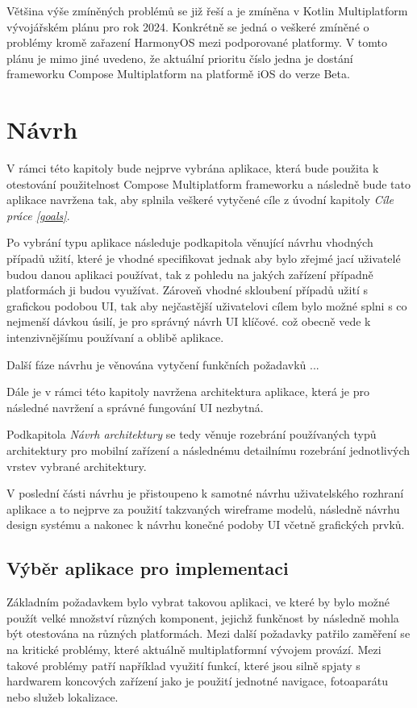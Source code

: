 Většina výše zmíněných problémů se již řeší a je zmíněna v Kotlin Multiplatform vývojářském plánu pro rok 2024. \cite{KMPRoaddMap} Konkrétně
se jedná o veškeré zmíněné o problémy kromě zařazení HarmonyOS mezi podporované platformy.%
V tomto plánu je mimo jiné uvedeno, že aktuální prioritu číslo jedna je dostání frameworku Compose Multiplatform na platformě iOS do verze Beta. \cite{KMPRoaddMap}

\chapter{Návrh}
V rámci této kapitoly bude nejprve vybrána aplikace, která bude použita k otestování použitelnost Compose Multiplatform frameworku a následně
bude tato aplikace navržena tak, aby splnila veškeré vytyčené cíle z úvodní kapitoly \textit{Cíle práce \ref{goals}}.

Po vybrání typu aplikace následuje podkapitola věnující návrhu vhodných případů užití, které je vhodné specifikovat jednak aby bylo zřejmé jací 
uživatelé budou danou aplikaci používat, tak z pohledu na jakých zařízení případně platformách ji budou využívat. 
Zároveň vhodné skloubení případů užití s grafickou podobou UI, tak aby nejčastější uživatelovi cílem bylo možné splni s co nejmenší dávkou úsilí, 
je pro správný návrh UI klíčové. 
což obecně vede k intenzivnějšímu používaní a oblibě aplikace.


Další fáze návrhu je věnována vytyčení funkčních požadavků ...

Dále je v rámci této kapitoly navržena architektura aplikace, která je pro následné navržení a správné fungování UI nezbytná. 

Podkapitola \textit{Návrh architektury} se tedy věnuje rozebrání používaných typů architektury pro mobilní zařízení a následnému detailnímu
rozebrání jednotlivých vrstev vybrané architektury.

V poslední části návrhu je přistoupeno k samotné návrhu uživatelského rozhraní aplikace a to nejprve za použití takzvaných wireframe modelů,
následně návrhu design systému a nakonec k návrhu konečné podoby UI včetně grafických prvků.



\section{Výběr aplikace pro implementaci}
Základním požadavkem bylo vybrat takovou aplikaci, ve které by bylo možné použít velké množství různých komponent, jejichž funkčnost by následně mohla být otestována
na různých platformách.
Mezi další požadavky patřilo zaměření se na kritické problémy, které aktuálně multiplatformní vývojem provází. 
Mezi takové problémy patří například využití funkcí, které jsou silně spjaty s hardwarem koncových zařízení jako je použití jednotné navigace, fotoaparátu 
nebo služeb lokalizace.

